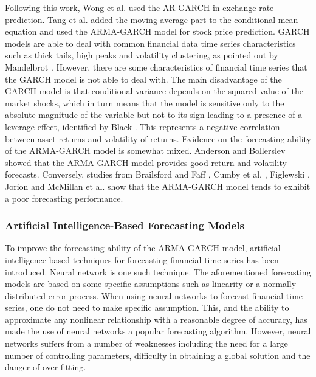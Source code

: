 Following this work, Wong et al. \cite{Wetal} used the AR-GARCH in exchange rate prediction. Tang et al. \cite{Tetal} added the moving average part to the conditional mean equation and used the ARMA-GARCH model for stock price prediction. GARCH models are able to deal with common financial data time series characteristics such as thick tails, high peaks and volatility clustering, as pointed out by Mandelbrot \cite{Mandelbrot}. However, there are some characteristics of financial time series that the GARCH model is not able to deal with. The main disadvantage of the GARCH model is that conditional variance depends on the squared value of the market shocks, which in turn means that the model is sensitive only to the absolute magnitude of the variable but not to its sign leading to a presence of a leverage effect, identified by Black \cite{Black}. This represents a negative correlation between asset returns and volatility of returns. Evidence on the forecasting ability of the ARMA-GARCH model is somewhat mixed. Anderson and Bollerslev \cite{A&B} showed that the ARMA-GARCH model provides good return and volatility forecasts. Conversely, studies from Brailsford and Faff \cite{f1}, Cumby et al. \cite{f2}, Figlewski \cite{f3}, Jorion \cite{f4}\cite{f5} and McMillan et al. \cite{f6} show that the ARMA-GARCH model tends to exhibit a poor forecasting performance. 

\subsubsection{Artificial Intelligence-Based Forecasting Models}

To improve the forecasting ability of the ARMA-GARCH model, artificial intelligence-based techniques for forecasting financial time series has been introduced. Neural network is one such technique. The aforementioned forecasting models are based on some specific assumptions such as linearity or a normally distributed error process. When using neural networks to forecast financial time series, one do not need to make specific assumption. This, and the ability to approximate any nonlinear relationship with a reasonable degree of accuracy, has made the use of neural networks a popular forecasting algorithm. However, neural networks suffers from a number of weaknesses including the need for a large number of controlling parameters, difficulty in obtaining a global solution and the danger of over-fitting.

